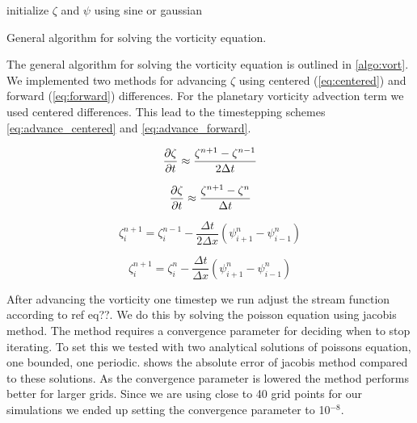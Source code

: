 \begin{algorithm}
  \SetAlgoLined
  initialize $\zeta$ and $\psi$ using sine or gaussian\\
  \caption{General algorithm for solving the vorticity equation.}
  \label{algo:vort}
\end{algorithm}


The general algorithm for solving the vorticity equation is outlined in
\cref{algo:vort}. We implemented two methods for advancing $\zeta$ using centered
(\cref{eq:centered}) and forward (\cref{eq:forward}) differences.
For the planetary vorticity advection term we used centered differences.
This lead to the timestepping schemes \cref{eq:advance_centered} and
\cref{eq:advance_forward}.


\begin{equation} \label{eq:centered}
  \pdv{\zeta}{t} \approx \frac{\zeta_{}^{n+1} - \zeta_{}^{n-1}}{2 \Delta t}
\end{equation}

\begin{equation} \label{eg:forward}
  \pdv{\zeta}{t} \approx \frac{\zeta_{}^{n+1} - \zeta_{}^{n}}{\Delta t}
\end{equation}


\begin{equation} \label{eq:advance_centered}
  \zeta_{i}^{n+1} = \zeta_{i}^{n-1} - \frac{\Delta t}{2 \Delta x}
    (\psi_{i+1}^{n} - \psi_{i-1}^{n})
\end{equation}


\begin{equation}   \label{eq:advance_forward}
  \zeta_{i}^{n+1} = \zeta_{i}^{n} - \frac{\Delta t}{\Delta x} (\psi_{i+1}^{n} - \psi_{i-1}^{n})
\end{equation}


After advancing the vorticity one timestep we run adjust the stream function
according to ref eq??. We do this by solving the poisson equation using
jacobis method. The method requires a convergence parameter for deciding when to
stop iterating. To set this we tested with two analytical solutions of poissons
equation, one bounded, one periodic.  shows the absolute
error of jacobis method compared to these solutions.
As the convergence parameter is lowered the method performs better for larger grids.
Since we are using close to 40 grid points for our simulations we ended up
setting the convergence parameter to 10$^{-8}$.

